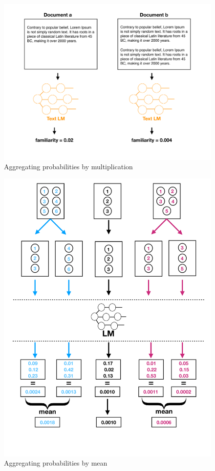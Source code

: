 \documentclass[12pt,mscthesis]{usiinfthesis}
\begin{document}
		\begin{figure}[htbp]
			\centering
			\includegraphics[width=\textwidth]{aggregation-by-multiplication}
			\caption{Aggregating probabilities by multiplication}
			\label{aggregation-by-multiplication}
			\end{figure}


			\begin{figure}[htbp]
			\centering
			\includegraphics[width=\textwidth]{aggregation-by-mean}
			\caption{Aggregating probabilities by mean}
			\label{aggregation-by-mean}
			\end{figure}
		
\end{document}
